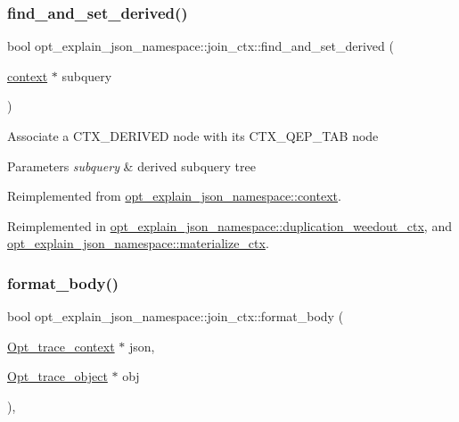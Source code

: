 \subsubsection{\texorpdfstring{find\+\_\+and\+\_\+set\+\_\+derived()}{find\_and\_set\_derived()}}
{\footnotesize\ttfamily bool opt\+\_\+explain\+\_\+json\+\_\+namespace\+::join\+\_\+ctx\+::find\+\_\+and\+\_\+set\+\_\+derived (\begin{DoxyParamCaption}\item[{\mbox{\hyperlink{classopt__explain__json__namespace_1_1context}{context}} $\ast$}]{subquery }\end{DoxyParamCaption})\hspace{0.3cm}{\ttfamily [virtual]}}

Associate a C\+T\+X\+\_\+\+D\+E\+R\+I\+V\+ED node with its C\+T\+X\+\_\+\+Q\+E\+P\+\_\+\+T\+AB node


\begin{DoxyParams}{Parameters}
{\em subquery} & derived subquery tree \\
\hline
\end{DoxyParams}


Reimplemented from \mbox{\hyperlink{classopt__explain__json__namespace_1_1context_afe66d6ec1a0f56114bc2b493b084c1a0}{opt\+\_\+explain\+\_\+json\+\_\+namespace\+::context}}.



Reimplemented in \mbox{\hyperlink{classopt__explain__json__namespace_1_1duplication__weedout__ctx_a2ff1982ca0d17cea2655f6273c229dd7}{opt\+\_\+explain\+\_\+json\+\_\+namespace\+::duplication\+\_\+weedout\+\_\+ctx}}, and \mbox{\hyperlink{classopt__explain__json__namespace_1_1materialize__ctx_a907eb60c00dc90af2832012bfed3bb1e}{opt\+\_\+explain\+\_\+json\+\_\+namespace\+::materialize\+\_\+ctx}}.

\mbox{\label{classopt__explain__json__namespace_1_1join__ctx_a5893d00aa1ebaa3c0f6d5cd55898f13c}} 
\subsubsection{\texorpdfstring{format\+\_\+body()}{format\_body()}}
{\footnotesize\ttfamily bool opt\+\_\+explain\+\_\+json\+\_\+namespace\+::join\+\_\+ctx\+::format\+\_\+body (\begin{DoxyParamCaption}\item[{\mbox{\hyperlink{classOpt__trace__context}{Opt\+\_\+trace\+\_\+context}} $\ast$}]{json,  }\item[{\mbox{\hyperlink{classOpt__trace__object}{Opt\+\_\+trace\+\_\+object}} $\ast$}]{obj }\end{DoxyParamCaption})\hspace{0.3cm}{\ttfamily [protected]}, {\ttfamily [virtual]}}

